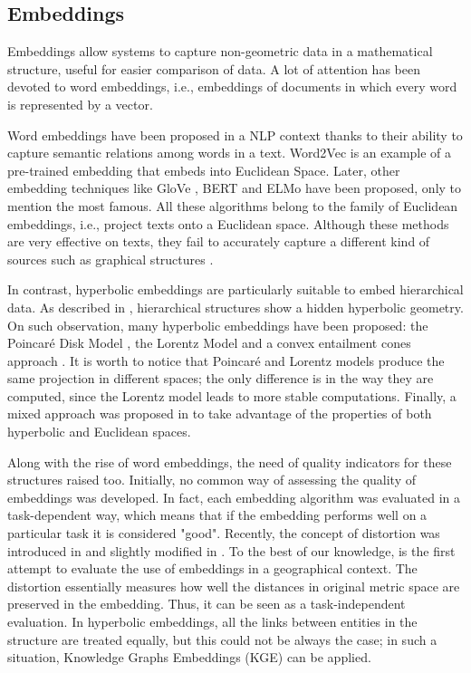\subsection{Embeddings}
Embeddings allow systems to capture non-geometric data in a mathematical structure, useful for easier comparison of data. A lot of attention has been devoted to word embeddings, i.e., embeddings of documents in which every word is represented by a vector. 

Word embeddings have been proposed in a NLP context thanks to their ability to capture semantic relations among words in a text. 
Word2Vec \cite{Mikolov2013EfficientEO} is an example of a pre-trained embedding that embeds into Euclidean Space. 
Later, other embedding techniques like GloVe \cite{pennington2014glove}, BERT \cite{devlin2018bert} and ELMo \cite{peters2018deep} have been proposed, only to mention the most famous. 
All these algorithms belong to the family of Euclidean embeddings, i.e., project texts onto a Euclidean space. 
Although these methods are very effective on texts, they fail to accurately capture a different kind of sources such as graphical structures \cite{NIPS2017_7213}. 

In contrast, hyperbolic embeddings are particularly suitable to embed hierarchical data. 
As described in \cite{krioukov2010hyperbolic}, hierarchical structures show a hidden hyperbolic geometry. 
On such observation, many hyperbolic embeddings have been proposed: the Poincar\'e Disk Model \cite{NIPS2017_7213}, the Lorentz Model \cite{DBLP:journals/corr/abs-1806-03417} and a convex entailment cones approach \cite{ganea2018hyperbolic}. 
It is worth to notice that Poincar\'e and Lorentz models produce the same projection in different spaces; the only difference is in the way they are computed, since the Lorentz model leads to more stable computations. 
Finally, a mixed approach was proposed in \cite{gu2018learning} to take advantage of the properties of both hyperbolic and Euclidean spaces. 

Along with the rise of word embeddings, the need of quality indicators for these structures raised too. 
Initially, no common way of assessing the quality of embeddings was developed. 
In fact, each embedding algorithm was evaluated in a task-dependent way, which means that if the embedding performs well on a particular task it is considered "good". 
Recently, the concept of distortion was introduced in \cite{sala2018representation} and slightly modified in \cite{dassereto2019evaluating}. 
To the best of our knowledge, \cite{dassereto2019evaluating} is the first attempt to evaluate the use of embeddings in a geographical context. 
The distortion essentially measures how well the distances in original metric space are preserved in the embedding. Thus, it can be seen as a task-independent evaluation. In hyperbolic embeddings, all the links between entities in the structure are treated equally, but this could not be always the case; in such a situation, Knowledge Graphs Embeddings (KGE) can be applied. 

